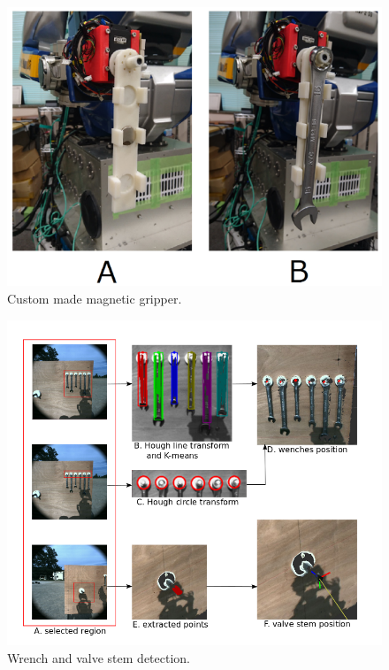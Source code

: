 \documentclass{standalone}
\begin{document}
\begin{figure}
  \includegraphics{sections/task2/images/figure2}
  \caption{Custom made magnetic gripper.}
  \label{fig:figure2}
\end{figure}

\begin{figure}
  \includegraphics[width=\columnwidth]{sections/task2/images/detection}
  \caption{Wrench and valve stem detection.}
  \label{fig:figure3}
\end{figure}
\end{document}
